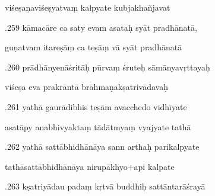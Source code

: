 \documentclass[article,12pt,a4paper]{memoir}%
\newcounter{parCount}
\begin{document}
	  
	  \pstart \leavevmode%
	viśeṣaṇaviśeṣyatvaṃ kalpyate kubjakhañjavat 
	{}
	\pend%
      

	  
	  \pstart {}.259 kāmacāre ca saty evam asataḥ syāt pradhānatā, 
	{}
	\pend%
      

	  
	  \pstart \leavevmode%
	guṇatvam itareṣāṃ ca teṣāṃ vā syāt pradhānatā 
	{}
	\pend%
      

	  
	  \pstart {}.260 prādhānyenāśritāḥ pūrvaṃ śruteḥ sāmānyavṛttayaḥ 
	{}
	\pend%
      

	  
	  \pstart \leavevmode%
	viśeṣa eva prakrāntā brāhmaṇakṣatrivādavaḥ 
	{}
	\pend%
      

	  
	  \pstart {}.261 yathā gaurādibhis teṣām avacchedo vidhīyate 
	{}
	\pend%
      

	  
	  \pstart \leavevmode%
	asatāpy anabhivyaktaṃ tādātmyaṃ vyajyate tathā 
	{}
	\pend%
      

	  
	  \pstart {}.262 yathā sattābhidhānāya sann arthaḥ parikalpyate 
	{}
	\pend%
      

	  
	  \pstart \leavevmode%
	tathāsattābhidhānāya nirupākhyo+api kalpate 
	{}
	\pend%
      

	  
	  \pstart {}.263 kṣatriyādau padaṃ kṛtvā buddhiḥ sattāntarāśrayā 
	{}
	\pend%
      
\end{document}
